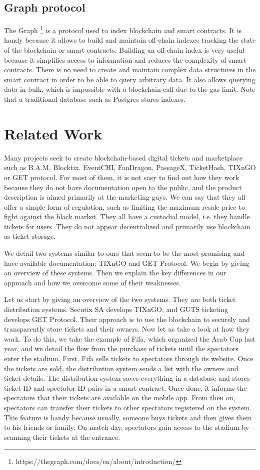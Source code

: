 \documentclass[a4paper,11pt,oneside]{report}
\begin{document}
\section{Graph protocol}
The Graph \footnote{https://thegraph.com/docs/en/about/introduction/} is a protocol used to index blockchain and smart contracts. It is handy because it allows to build and maintain off-chain indexes tracking the state of the blockchain or smart contracts. Building an off-chain index is very useful because it simplifies access to information and reduces the complexity of smart contracts. There is no need to create and maintain complex data structures in the smart contract in order to be able to query arbitrary data. It also allows querying data in bulk, which is impossible with a blockchain call due to the gas limit. Note that a traditional database such as Postgres stores indexes.

\chapter{Related Work}
Many projects seek to create blockchain-based digital tickets and marketplace such as B.A.M, Blocktix. EventCHI, FanDragon, PassageX, TicketHash, TIXnGO or GET protocol. For most of them, it is not easy to find out how they work because they do not have documentation open to the public, and the product description is aimed primarily at the marketing guys. We can say that they all offer a simple form of regulation, such as limiting the maximum resale price to fight against the black market. They all have a custodial model, i.e. they handle tickets for users. They do not appear decentralized and primarily use blockchain as ticket storage.

We detail two systems similar to ours that seem to be the most promising and have available documentation: TIXnGO and GET Protocol. We begin by giving an overview of these systems. Then we explain the key differences in our approach and how we overcome some of their weaknesses.

Let us start by giving an overview of the two systems. They are both ticket distribution systems. Secutix SA develops TIXnGO, and GUTS ticketing develops GET Protocol. Their approach is to use the blockchain to securely and transparently store tickets and their owners. Now let us take a look at how they work. To do this, we take the example of Fifa, which organized the Arab Cup last year, and we detail the flow from the purchase of tickets until the spectators enter the stadium. First, Fifa sells tickets to spectators through its website. Once the tickets are sold, the distribution system sends a list with the owners and ticket details. The distribution system saves everything in a database and stores ticket ID and spectator ID pairs in a smart contract. Once done, it informs the spectators that their tickets are available on the mobile app. From then on, spectators can transfer their tickets to other spectators registered on the system. This feature is handy because usually, someone buys tickets and then gives them to his friends or family. On match day, spectators gain access to the stadium by scanning their tickets at the entrance.
\end{document}
